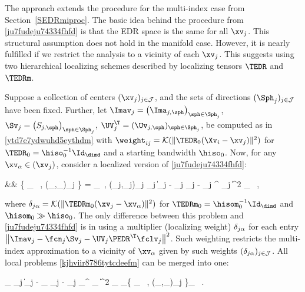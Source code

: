 The approach extends the procedure for the multi-index case from Section~\ref{SEDRmiproc}.
The basic idea behind the procedure from \eqref{ju7fudeju74334fhfd} is that the EDR space 
is the same for all \( \xv_{j} \).
This structural assumption does not hold in the manifold case.
However, it is nearly fulfilled if we restrict the analysis to a vicinity of each \( \xv_{j} \).
This suggests using two hierarchical localizing schemes described by 
localizing tensors \( \TEDR \) and \( \TEDRm \).

Suppose a collection of centers \( ( \xv_{j} )_{j \in \JJJ} \), and 
the sets of directions \( (\Sph_{j})_{j \in \JJJ} \) have been fixed.
% 
Further, let 
\( \Imav_{j} = \bigl( \Ima_{j,\sph} \bigr)_{\sph \in \Sph_{j}} \),
\( \Sv_{j} = \bigl( S_{j,\sph} \bigr)_{\sph \in \Sph_{j}} \),
\( \UV_{j}^{\T} = (\Uv_{j,\sph})_{\sph \in \Sph_{j}} \),
be computed as in \eqref{ytd7e7ydwuhd5eythdm} with 
\( \weight_{ij} = \Kern(\| \TEDR_{0} (\Xv_{i} - \xv_{j}) \|^{2}) \)
for \( \TEDR_{0} = \hiso_{0}^{-1} \Id_{\dimd} \) and a starting bandwidth \( \hiso_{0} \).
%
Now, for any \( \xv_{\jl} \in (\xv_{j}) \), consider a localized version of
\eqref{ju7fudeju74334fhfd}:
\begin{EQA}[rcl]
	&& \nquad
	\bigl\{ \PEDR_{\jl} \, , (\fcn_{\jjl},\fclv_{\jjl})_{j \in \JJJ} \bigr\}
	= 
	\arginf_{\PEDR \, , (\fcn_{j},\fclv_{j})_{j \in \JJJ}} 
	\sum_{j \in \JJJ} 
	\bigl\| \Imav_{j} - \fcn_{j} \Sv_{j} - \UV_{j} \PEDR^{\T} \fclv_{j} \bigr\|^{2}
	\weightM_{\jjl}
	\, ,
	\qquad \quad
\label{kjhviir8786tytcdeefm}
\end{EQA}
where \( \weightM_{\jjl} = \Kern(\| \TEDRm_{0} (\xv_{j} - \xv_{\jl}) \|^{2}) \) for
\( \TEDRm_{0} = \hisom_{0}^{-1} \Id_{\dimd} \) and \( \hisom_{0} \gg \hiso_{0} \).
The only difference between this problem and \eqref{ju7fudeju74334fhfd} is in using a multiplier (localizing weight)
\( \delta_{j\alpha} \)
for each entry \( \bigl\| \Imav_{j} - \fcn_{j} \Sv_{j} - \UV_{j} \PEDR^{\T} \fclv_{j} \bigr\|^{2} \).
Such weighting restricts the multi-index approximation to a vicinity of \( \xv_{\jl} \) given by 
such weights \( (\delta_{j\alpha})_{j \in \mathcal{J}} \). 
All local problems \eqref{kjhviir8786tytcdeefm} can be merged into one:
\begin{EQA}[c]
	\sum_{\jl \in \JJJ} \sum_{j \in \JJJ}
	\bigl\| \Imav_{j} - \fcn_{\jjl} \Sv_{j} - \UV_{j} \PEDR_{\jl}^{\T} \fclv_{\jjl} \bigr\|^{2} \weightM_{\jjl}
	\to 
	\inf_{\{ \PEDR_{\jl} \, , (\fcn_{\jjl},\fclv_{\jjl})_{j \in \JJJ} \}_{\jl \in \JJJ}}
	\, .
	\qquad \quad
\label{kjhviir8786tytcdeefde}
\end{EQA}

